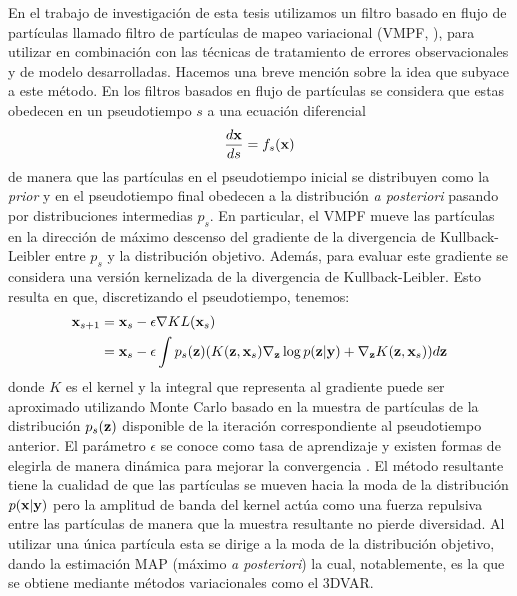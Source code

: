 En el trabajo de investigación de esta tesis utilizamos un filtro basado en flujo de partículas llamado filtro de partículas de mapeo variacional (VMPF, \cite{Pulido2019}), para utilizar en combinación con las técnicas de tratamiento de errores observacionales y de modelo desarrolladas. Hacemos una breve mención sobre la idea que subyace a este método. En los filtros basados en flujo de partículas se considera que estas obedecen en un pseudotiempo $s$ a una ecuación diferencial
\begin{align*}
    \frac{d\mathbf{x}}{ds} = f_s(\mathbf{x})
\end{align*}
de manera que las partículas en el pseudotiempo inicial se distribuyen como la \textit{prior} y en el pseudotiempo final obedecen a la distribución \textit{a posteriori} pasando por distribuciones intermedias $p_s$. En particular, el VMPF mueve las partículas en la dirección de máximo descenso del gradiente de la divergencia de Kullback-Leibler entre $p_s$ y la distribución objetivo. Además, para evaluar este gradiente se considera una versión kernelizada de la divergencia de Kullback-Leibler. Esto resulta en que, discretizando el pseudotiempo, tenemos:
\begin{align*}
    \mathbf{x}_{s+1} &= \mathbf{x}_s - \epsilon \nabla KL(\mathbf{x}_s) \\
    &= \mathbf{x}_s - \epsilon \int p_s(\mathbf{z}) (K(\mathbf{z}, \mathbf{x}_s) \nabla_{\mathbf{z}} \log p(\mathbf{z} | \mathbf{y}) + \nabla_{\mathbf{z}} K(\mathbf{z}, \mathbf{x}_s)) d\mathbf{z}
\end{align*}
donde $K$ es el kernel y la integral que representa al gradiente puede ser aproximado utilizando Monte Carlo basado en la muestra de partículas de la distribución $p_s(\mathbf{z})$ disponible de la iteración correspondiente al pseudotiempo anterior. El parámetro $\epsilon$ se conoce como tasa de aprendizaje y existen formas de elegirla de manera dinámica para mejorar la convergencia \citep{Zeiler2012}. El método resultante tiene la cualidad de que las partículas se mueven hacia la moda de la distribución $p(\mathbf{x} | \mathbf{y})$ pero la amplitud de banda del kernel actúa como una fuerza repulsiva entre las partículas \citep{Liu2016} de manera que la muestra resultante no pierde diversidad. Al utilizar una única partícula esta se dirige a la moda de la distribución objetivo, dando la estimación MAP (máximo \textit{a posteriori}) la cual, notablemente, es la que se obtiene mediante métodos variacionales como el 3DVAR.

